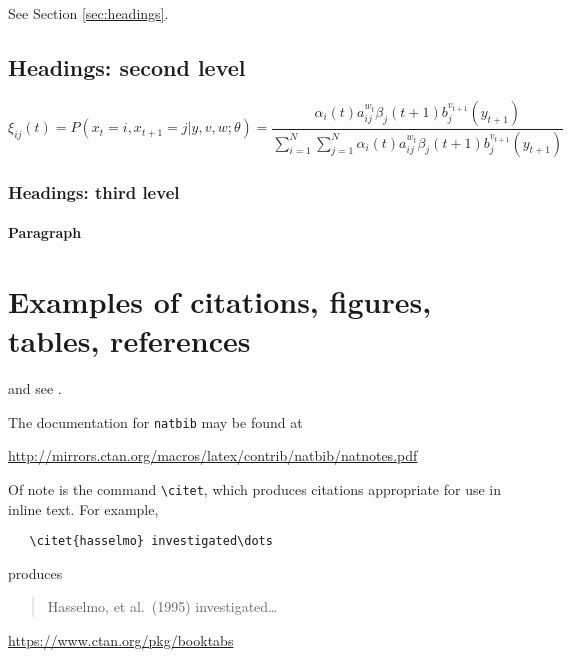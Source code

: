 \appendix

 












\lipsum[4] See Section \ref{sec:headings}.

\subsection{Headings: second level}
\lipsum[5]
\begin{equation}
\xi _{ij}(t)=P(x_{t}=i,x_{t+1}=j|y,v,w;\theta)= {\frac {\alpha _{i}(t)a^{w_t}_{ij}\beta _{j}(t+1)b^{v_{t+1}}_{j}(y_{t+1})}{\sum _{i=1}^{N} \sum _{j=1}^{N} \alpha _{i}(t)a^{w_t}_{ij}\beta _{j}(t+1)b^{v_{t+1}}_{j}(y_{t+1})}}
\end{equation}

\subsubsection{Headings: third level}
\lipsum[6]

\paragraph{Paragraph}
\lipsum[7]

\section{Examples of citations, figures, tables, references}
\label{sec:others}
\lipsum[8] \cite{kour2014real,kour2014fast} and see \cite{hadash2018estimate}.

The documentation for \verb+natbib+ may be found at
\begin{center}
  \url{http://mirrors.ctan.org/macros/latex/contrib/natbib/natnotes.pdf}
\end{center}
Of note is the command \verb+\citet+, which produces citations
appropriate for use in inline text.  For example,
\begin{verbatim}
   \citet{hasselmo} investigated\dots
\end{verbatim}
produces
\begin{quote}
  Hasselmo, et al.\ (1995) investigated\dots
\end{quote}

\begin{center}
  \url{https://www.ctan.org/pkg/booktabs}
\end{center}


